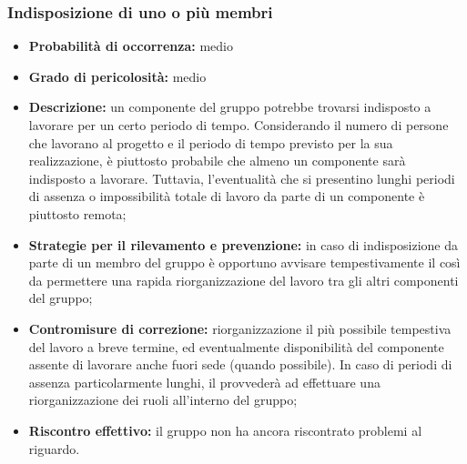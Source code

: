\subsubsection{Indisposizione di uno o più membri}
\hypertarget{subsubsect:indisposizione}{}
\begin{itemize}
\item \textbf{Probabilità di occorrenza:} medio
\item \textbf{Grado di pericolosità:} medio

\item \textbf{Descrizione:} un componente del gruppo potrebbe trovarsi indisposto a lavorare per un certo periodo di tempo. Considerando il numero di persone che lavorano al progetto  e il periodo di tempo previsto per la sua realizzazione, è piuttosto probabile che almeno un componente sarà indisposto a lavorare. Tuttavia, l'eventualità che si presentino lunghi periodi di assenza o impossibilità totale di lavoro da parte di un componente è piuttosto remota;
\item \textbf{Strategie per il rilevamento e prevenzione:} in caso di indisposizione da parte di un membro del gruppo è opportuno avvisare tempestivamente il \ruoloResponsabile{}  così da permettere una rapida riorganizzazione del lavoro tra gli altri componenti del gruppo;

\item \textbf{Contromisure di correzione:} riorganizzazione il più possibile tempestiva del lavoro a breve termine, ed eventualmente disponibilità del componente assente di lavorare anche fuori sede (quando possibile). In caso di periodi di assenza particolarmente lunghi, il \ruoloResponsabile{} provvederà ad effettuare una riorganizzazione dei ruoli all'interno del gruppo;

\item \textbf{Riscontro effettivo:} il gruppo non ha ancora riscontrato problemi al riguardo.
\end{itemize}

